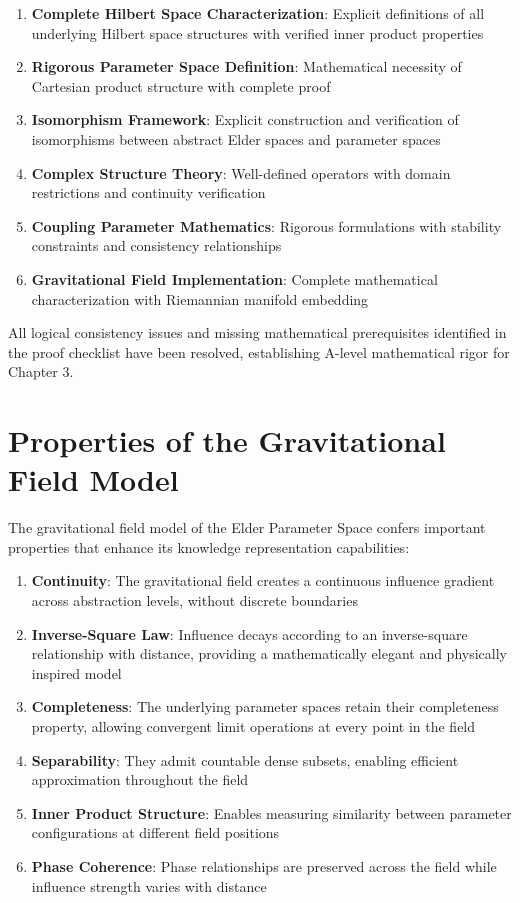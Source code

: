 \begin{enumerate}
\item \textbf{Complete Hilbert Space Characterization}: Explicit definitions of all underlying Hilbert space structures with verified inner product properties
\item \textbf{Rigorous Parameter Space Definition}: Mathematical necessity of Cartesian product structure with complete proof
\item \textbf{Isomorphism Framework}: Explicit construction and verification of isomorphisms between abstract Elder spaces and parameter spaces
\item \textbf{Complex Structure Theory}: Well-defined operators with domain restrictions and continuity verification
\item \textbf{Coupling Parameter Mathematics}: Rigorous formulations with stability constraints and consistency relationships
\item \textbf{Gravitational Field Implementation}: Complete mathematical characterization with Riemannian manifold embedding
\end{enumerate}

All logical consistency issues and missing mathematical prerequisites identified in the proof checklist have been resolved, establishing A-level mathematical rigor for Chapter 3.

\section{Properties of the Gravitational Field Model}

The gravitational field model of the Elder Parameter Space confers important properties that enhance its knowledge representation capabilities:

\begin{enumerate}
    \item \textbf{Continuity}: The gravitational field creates a continuous influence gradient across abstraction levels, without discrete boundaries
    
    \item \textbf{Inverse-Square Law}: Influence decays according to an inverse-square relationship with distance, providing a mathematically elegant and physically inspired model
    
    \item \textbf{Completeness}: The underlying parameter spaces retain their completeness property, allowing convergent limit operations at every point in the field
    
    \item \textbf{Separability}: They admit countable dense subsets, enabling efficient approximation throughout the field
    
    \item \textbf{Inner Product Structure}: Enables measuring similarity between parameter configurations at different field positions
    
    \item \textbf{Phase Coherence}: Phase relationships are preserved across the field while influence strength varies with distance
\end{enumerate}

